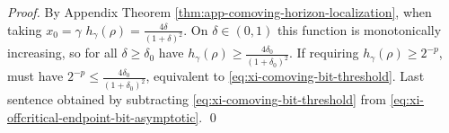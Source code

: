 \begin{proof}
By Appendix Theorem \ref{thm:app-comoving-horizon-localization}, when taking \(x_0=\gamma\)
\(
h_{\gamma}(\rho)=\frac{4\delta}{(1+\delta)^2}
\).
On \(\delta\in(0,1)\) this function is monotonically increasing, so for all \(\delta\ge\delta_0\) have
\(
h_{\gamma}(\rho)\ge \frac{4\delta_0}{(1+\delta_0)^2}
\).
If requiring \(h_{\gamma}(\rho)\ge 2^{-p}\), must have \(2^{-p}\le \frac{4\delta_0}{(1+\delta_0)^2}\), equivalent to \eqref{eq:xi-comoving-bit-threshold}.
Last sentence obtained by subtracting \eqref{eq:xi-comoving-bit-threshold} from \eqref{eq:xi-offcritical-endpoint-bit-asymptotic}. \qed
\end{proof}
